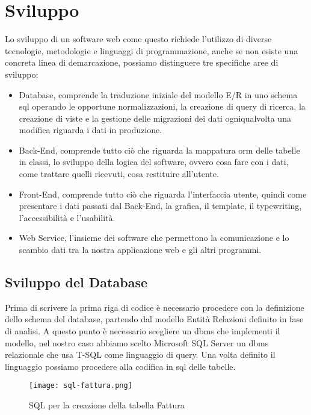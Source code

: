 
\chapter{Sviluppo}

Lo sviluppo di un software web come questo richiede l'utilizzo di diverse tecnologie, metodologie e linguaggi di programmazione, anche se non esiste una concreta linea di demarcazione, possiamo distinguere tre specifiche aree di sviluppo:
\begin{itemize}
    \item Database, comprende la traduzione iniziale del modello E/R in uno schema \Gls{sql} operando le opportune normalizzazioni, la creazione di query di ricerca, la creazione di viste e la gestione delle migrazioni dei dati ogniqualvolta una modifica riguarda i dati in produzione.
	\item Back-End, comprende tutto ciò che riguarda la mappatura \Gls{orm} delle tabelle in classi, lo sviluppo della logica del software, ovvero cosa fare con i dati, come trattare quelli ricevuti, cosa restituire all'utente.
	\item Front-End, comprende tutto ciò che riguarda l'interfaccia utente, quindi come presentare i dati passati dal Back-End, la grafica, il template, il typewriting, l’accessibilità e l’usabilità.
	\item Web Service, l'insieme dei software che permettono la comunicazione e lo scambio dati tra la nostra applicazione web e gli altri programmi.
\end{itemize}


\section{Sviluppo del Database}

Prima di scrivere la prima riga di codice è necessario procedere con la definizione dello schema del database, partendo dal modello Entità Relazioni definito in fase di analisi.
A questo punto è necessario scegliere un \Gls{dbms} che implementi il modello, nel nostro caso abbiamo scelto Microsoft SQL Server un \Gls{dbms} relazionale che usa T-SQL come linguaggio di query.
Una volta definito il linguaggio possiamo procedere alla codifica in \Gls{sql} delle tabelle.

\begin{figure}[H]
    \centering
    \texttt{[image: sql-fattura.png]}
    \caption{SQL per la creazione della tabella Fattura}
    \label{fig:SqlFattura}
\end{figure}

